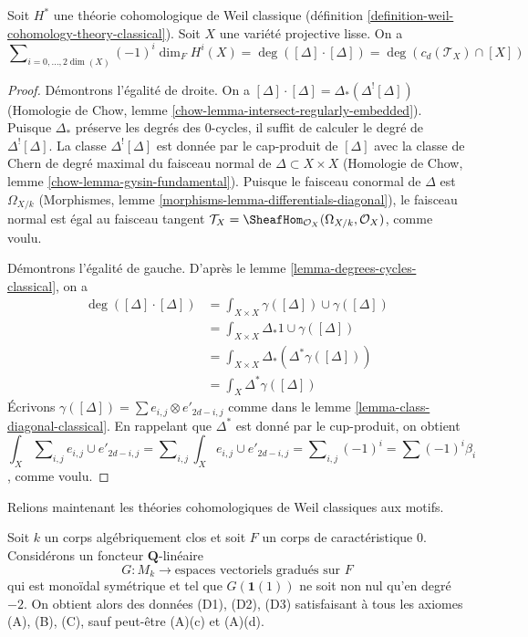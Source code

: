 \begin{lemma}
\label{lemma-square-diagonal-classical}
Soit $H^*$ une théorie cohomologique de Weil classique
(définition \ref{definition-weil-cohomology-theory-classical}).
Soit $X$ une variété projective lisse. On a
$$
\sum\nolimits_{i = 0, \ldots, 2\dim(X)} (-1)^i\dim_F H^i(X) =
\deg([\Delta] \cdot [\Delta]) = \deg(c_d(\mathcal{T}_X) \cap [X])
$$
\end{lemma}

\begin{proof}
Démontrons l'égalité de droite. On a
$[\Delta] \cdot [\Delta] = \Delta_*(\Delta^![\Delta])$
(Homologie de Chow, lemme \ref{chow-lemma-intersect-regularly-embedded}).
Puisque $\Delta_*$ préserve les degrés des $0$-cycles, il suffit de calculer
le degré de $\Delta^![\Delta]$. La classe $\Delta^![\Delta]$ est donnée
par le cap-produit de $[\Delta]$ avec
la classe de Chern de degré maximal du faisceau normal de $\Delta \subset X \times X$
(Homologie de Chow, lemme \ref{chow-lemma-gysin-fundamental}).
Puisque le faisceau conormal de $\Delta$ est $\Omega_{X/k}$
(Morphismes, lemme \ref{morphisms-lemma-differentials-diagonal}),
le faisceau normal est égal au faisceau tangent
$\mathcal{T}_X = \SheafHom_{\mathcal{O}_X}(\Omega_{X/k}, \mathcal{O}_X)$,
comme voulu.

\medskip\noindent
Démontrons l'égalité de gauche. D'après le lemme \ref{lemma-degrees-cycles-classical}, on a
\begin{align*}
\deg([\Delta] \cdot [\Delta])
& =
\int_{X \times X} \gamma([\Delta]) \cup \gamma([\Delta]) \\
& =
\int_{X \times X} \Delta_*1 \cup \gamma([\Delta]) \\
& =
\int_{X \times X} \Delta_*(\Delta^*\gamma([\Delta])) \\
& =
\int_X \Delta^*\gamma([\Delta])
\end{align*}
Écrivons $\gamma([\Delta]) = \sum  e_{i, j} \otimes e'_{2d - i , j}$
comme dans le lemme \ref{lemma-class-diagonal-classical}.
En rappelant que $\Delta^*$ est donné par le cup-produit, on obtient
$$
\int_X \sum\nolimits_{i, j} e_{i, j} \cup e'_{2d - i, j} =
\sum\nolimits_{i, j} \int_X e_{i, j} \cup e'_{2d - i, j} =
\sum\nolimits_{i, j} (-1)^i = \sum (-1)^i\beta_i
$$,
comme voulu.
\end{proof}




\noindent
Relions maintenant les théories cohomologiques de Weil classiques aux motifs.

\begin{lemma}
\label{lemma-from-functor-to-weil-classical}
Soit $k$ un corps algébriquement clos et soit $F$ un corps de
caractéristique $0$. Considérons un foncteur $\mathbf{Q}$-linéaire
$$
G : M_k \longrightarrow \text{espaces vectoriels gradués sur }F\text{}
$$
qui est monoïdal symétrique et tel que $G(\mathbf{1}(1))$
ne soit non nul qu'en degré $-2$. On obtient alors des données (D1), (D2), (D3)
satisfaisant à tous les axiomes (A), (B), (C), sauf peut-être (A)(c) et (A)(d).
\end{lemma}


